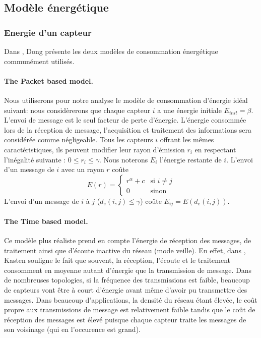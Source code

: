 \subsection{Modèle énergétique}
\subsubsection{Energie d'un capteur}
Dans \cite{Dong2005}, Dong présente les deux modèles de consommation énergétique communément utilisés.
\paragraph{The Packet based model.\label{packet_based_model}}
Nous utiliserons pour notre analyse le modèle de consommation d'énergie idéal suivant:
nous considèrerons que chaque capteur $i$ a une énergie initiale $E_{init}=\beta$.
L'envoi de message est le seul facteur de perte d'énergie. L'énergie consommée lors de la réception de message, l'acquisition et traitement des informations sera considérée comme négligeable.
Tous les capteurs $i$ offrant les mêmes caractéristiques, ils peuvent modifier leur rayon d'émission $r_i$ en respectant l'inégalité suivante : $0 \leq r_i \leq \gamma$.
Nous noterons $E_i$ l'énergie restante de $i$.
L'envoi d'un message de $i$ avec un rayon $r$ coûte $$ E(r)= \begin{cases} r^\alpha + c & \text{si }i\neq j \\ 0 & \text{sinon}  \end{cases}$$
L'envoi d'un message de $i$ à $j$ ($d_e(i,j)\leq \gamma$) coûte  $ E_{ij}=E(d_e(i,j))$.

\paragraph{The Time based model.}
Ce modèle plus réaliste prend en compte l'énergie de réception des messages, de traitement ainsi que d'écoute inactive du réseau (mode veille).
En effet, dans \cite{Kasten2001}, Kasten souligne le fait que souvent, la réception, l'écoute et le traitement consomment en moyenne autant d'énergie que la transmission de message.
Dans de nombreuses topologies, si la fréquence des transmissions est faible, beaucoup de capteurs vont être à court d'énergie avant même d'avoir pu transmettre des messages.
Dans beaucoup d'applications, la densité du réseau étant élevée, le coût propre aux transmissions de message est relativement faible tandis que le coût de réception des messages est élevé puisque chaque capteur traite les messages de son voisinage (qui en l'occurence est grand).



